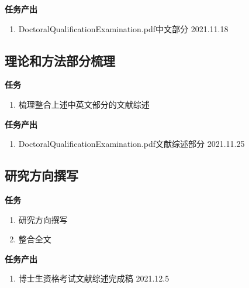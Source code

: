 \documentclass[
  12pt,
]{ctexart}
\providecommand{\tightlist}{%
  \setlength{\itemsep}{0pt}\setlength{\parskip}{0pt}}
\begin{document}
\textbf{任务产出}

\begin{enumerate}
\def\labelenumi{\arabic{enumi}.}
\tightlist
\item
  DoctoralQualificationExamination.pdf中文部分 \hfill 2021.11.18
\end{enumerate}

\hypertarget{ux7406ux8bbaux548cux65b9ux6cd5ux90e8ux5206ux68b3ux7406}{%
\subsection{理论和方法部分梳理}\label{ux7406ux8bbaux548cux65b9ux6cd5ux90e8ux5206ux68b3ux7406}}

\textbf{任务}

\begin{enumerate}
\def\labelenumi{\arabic{enumi}.}
\tightlist
\item
  梳理整合上述中英文部分的文献综述
\end{enumerate}

\textbf{任务产出}

\begin{enumerate}
\def\labelenumi{\arabic{enumi}.}
\tightlist
\item
  DoctoralQualificationExamination.pdf文献综述部分 \hfill 2021.11.25
\end{enumerate}

\hypertarget{ux7814ux7a76ux65b9ux5411ux64b0ux5199}{%
\subsection{研究方向撰写}\label{ux7814ux7a76ux65b9ux5411ux64b0ux5199}}

\textbf{任务}

\begin{enumerate}
\def\labelenumi{\arabic{enumi}.}
\item
  研究方向撰写
\item
  整合全文
\end{enumerate}

\textbf{任务产出}

\begin{enumerate}
\def\labelenumi{\arabic{enumi}.}
\tightlist
\item
  博士生资格考试文献综述完成稿 \hfill 2021.12.5
\end{enumerate}
\end{document}
